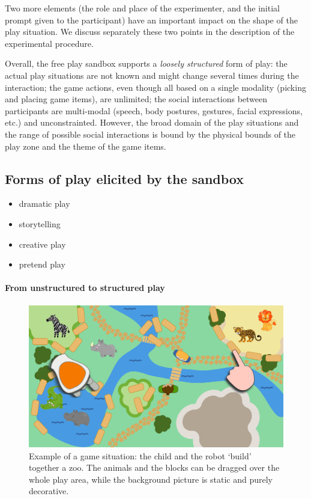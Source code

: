 \documentclass[a4paper]{article}
\begin{document}
Two more elements (the role and place of the experimenter, and the initial
prompt given to the participant) have an important impact on the shape of the
play situation. We discuss separately these two points in the description of the
experimental procedure.

Overall, the free play sandbox supports a \emph{loosely structured} form of play: the
actual play situations are not known and might change several times during the
interaction; the game actions, even though all based on a single modality (picking and
placing game items), are unlimited; the social interactions between participants
are multi-modal (speech, body postures, gestures, facial expressions, etc.) and
unconstrainted. However, the broad domain of the play situations and the range of
possible social interactions is bound by the physical bounds of the play zone
and the theme of the game items.

\subsection{Forms of play elicited by the sandbox}

\begin{itemize}
    \item dramatic play
    \item storytelling
    \item creative play
    \item pretend play
\end{itemize}

\paragraph{From unstructured to structured play}

\begin{figure}
    \centering
    \includegraphics[width=0.9\linewidth]{sandbox}
    \caption{Example of a game situation: the child and the robot `build'
    together a zoo. The animals and the blocks can be dragged over the whole
    play area, while the background picture is static and purely decorative.}
    \label{fig|sandbox}
\end{figure}
\end{document}
